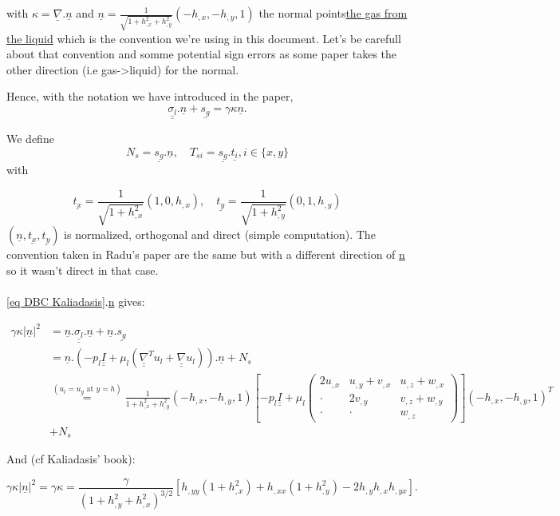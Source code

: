 \documentclass[12pt]{article}
\begin{document}
with $\kappa = \underline{\nabla}.\underline{n}$ and $\underline{n}=\frac{1}{\sqrt{1+h_{,x}^2+h_{,y}^2}}(-h_{,x}, -h_{,y}, 1)$ the normal points\underline{the gas from the liquid} which is the convention we're using in this document. Let's be carefull about that convention and somme potential sign errors as some paper takes the other direction (i.e gas->liquid) for the normal.

Hence, with the notation we have introduced in the paper, $$\underline{\underline{\sigma_l}}.\underline{n}+\underline{s_g}=\gamma\kappa\underline{n}.$$

We define $$N_s = \underline{s_g}.\underline{n}, \quad T_{si}=\underline{s_g}.\underline{t_i}, i\in\{x, y\}$$ with 

$$\underline{t_x}=\frac{1}{\sqrt{1+h_{,x}^2}}(1, 0, h_{,x}),\quad \underline{t_y}=\frac{1}{\sqrt{1+h_{,y}^2}}(0, 1, h_{,y})$$ 
$(\underline{n}, \underline{t_x}, \underline{t_y})$ is normalized, orthogonal and direct (simple computation). The convention taken in Radu's paper are the same but with a different direction of \underline{n} so it wasn't direct in that case.
\newline
\\
\\
\ref{eq DBC Kaliadasis}.\underline{n} gives:


\begin{align*}
\gamma \kappa |\underline{n}|^2&= \underline{n}.\underline{\underline{\sigma_l}}.\underline{n} + \underline{n}.\underline{s_g} \\
 &= \underline{n}.\left( -p_l \underline{\underline{I}} + \mu_l(\underline{\underline{\nabla}}^Tu_l+\underline{\underline{\nabla}}u_l)\right).\underline{n}+N_s\\
 &\overset{(u_l=u_g \text{ at } y=h)}{=} \frac{1}{1+h_{,x}^2+h_{,y}^2}(-h_{,x}, -h_{,y}, 1)\left[ -p_l\underline{\underline{I}} + \mu_l\begin{pmatrix}
2u_{,x} & u_{,y}+v_{,x} & u_{,z}+w_{,x} \\
\cdot & 2v_{,y} & v_{,z}+w_{,y} \\
\cdot & \cdot & w_{,z}
\end{pmatrix} \right](-h_{,x}, -h_{,y}, 1)^T\\ 
&+N_s
\end{align*}

And (cf Kaliadasis' book): 

$$\gamma \kappa |\underline{n}|^2 = \gamma \kappa = \frac{\gamma}{(1+h_{,y}^2+h_{,x}^2)^{3/2}}\left[ h_{,yy}(1+h_{,x}^2)+h_{,xx}(1+h_{,y}^2)-2h_{,y}h_{,x}h_{,yx}\right].$$
\end{document}

